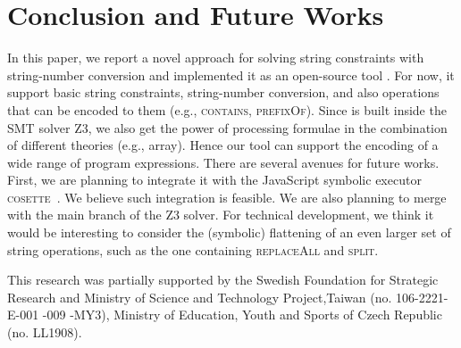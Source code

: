 \documentclass[sigplan,screen]{acmart}
\begin{document}
\section{Conclusion and Future Works}
\label{section:conclusion}
In this paper, we report a novel approach for solving string constraints with string-number conversion and implemented it as an open-source tool {\tool}. For now, it support basic string constraints, string-number conversion, and also operations that can be encoded to them (e.g., \textsc{contains}, \textsc{prefixOf}). Since {\tool} is built inside the SMT solver Z3, we also get the power of processing formulae in the combination of different theories (e.g., array). Hence our tool can support the encoding of a wide range of program expressions. There are several avenues for future works. First, we are planning to integrate it with the JavaScript symbolic executor \textsc{cosette}~\cite{santos2018symbolic}. We  believe such integration  is feasible. 
We are also planning to merge  {\tool}  with the main branch of the Z3 solver. For technical development, we think it would be interesting to consider the (symbolic) flattening of an even larger set of string operations, such as the one containing  \textsc{replaceAll} and \textsc{split}. 




\begin{acks}
This research was  partially supported by the  Swedish Foundation for Strategic Research and Ministry of Science and Technology Project,Taiwan (no. 106-2221-E-001 -009 -MY3), Ministry of Education, Youth and Sports of Czech Republic (no. LL1908).
\end{acks}

 \balance


\end{document}
